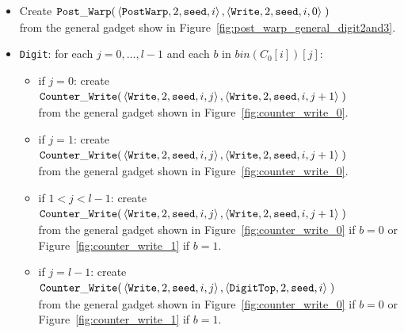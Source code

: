 \begin{itemize}
    \item Create
    $\begin{aligned}[t]
        {\tt Post\_Warp}(&\left\langle {\tt PostWarp}, 2, {\tt seed}, i    \right\rangle,
                   \left\langle {\tt Write},    2, {\tt seed}, i, 0 \right\rangle \;)
    \end{aligned}$\\ from the general gadget show in Figure~\ref{fig:post_warp_general_digit2and3}.

    \item {\tt Digit}: for each $j=0,\ldots,l-1$ and each $b$ in $bin(C_0[i])[j]$:
    \begin{itemize}
        \item if $j = 0$: create
        $\begin{aligned}[t]
            {\tt Counter\_Write}(&\left\langle {\tt Write}, 2, {\tt seed}, i, j \right\rangle, \left\langle {\tt Write}, 2, {\tt seed}, i, j + 1 \right\rangle \;)
        \end{aligned}$\\from the general gadget shown in Figure~\ref{fig:counter_write_0}.

        \item if $j = 1$: create
        $\begin{aligned}[t]
            {\tt Counter\_Write}(&\left\langle {\tt Write}, 2, {\tt seed}, i, j \right\rangle, \left\langle {\tt Write}, 2, {\tt seed}, i, j + 1 \right\rangle \;)
        \end{aligned}$\\from the general gadget shown in Figure~\ref{fig:counter_write_0}.

        \item if $1 < j < l-1$: create
        $\begin{aligned}[t]
            {\tt Counter\_Write}(&\left\langle {\tt Write}, 2, {\tt seed}, i, j \right\rangle, \left\langle {\tt Write}, 2, {\tt seed}, i, j + 1 \right\rangle \;)
        \end{aligned}$\\from the general gadget shown in Figure~\ref{fig:counter_write_0} if $b = 0$ or Figure~\ref{fig:counter_write_1} if $b = 1$.

        \item if $j = l-1$: create
        $\begin{aligned}[t]
            {\tt Counter\_Write}(&\left\langle {\tt Write}, 2, {\tt seed}, i, j \right\rangle, \left\langle {\tt DigitTop}, 2, {\tt seed}, i \right\rangle \;)
        \end{aligned}$\\from the general gadget shown in Figure~\ref{fig:counter_write_0} if $b = 0$ or Figure~\ref{fig:counter_write_1} if $b = 1$.
    \end{itemize}



\end{itemize}

